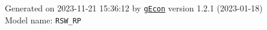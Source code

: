 \documentclass[10pt,a4paper]{article}
\numberwithin{equation}{section}
\begin{document}
\begin{landscape}
\begin{flushleft}{\large
Generated  on 2023-11-21 15:36:12 by \href{http://gecon.r-forge.r-project.org/}{\texttt{gEcon}} version 1.2.1 (2023-01-18)\\
Model name: \verb+RSW_RP+
}\end{flushleft}


\end{landscape}

\end{document}
